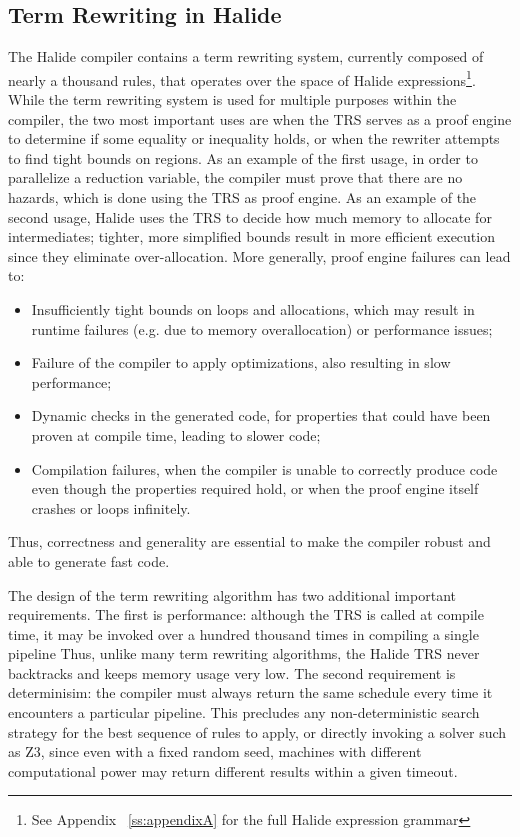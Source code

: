 \documentclass[sigplan,10pt,review,anonymous]{acmart}\settopmatter{printfolios=true,printccs=false,printacmref=false}
\begin{document}
\subsection{Term Rewriting in Halide}

The Halide compiler contains a term rewriting system, currently composed of
nearly a thousand rules, that operates over the space of Halide
expressions\footnote{See Appendix ~\ref{ss:appendixA} for the full Halide
  expression grammar}. While the term rewriting system is used for multiple
purposes within the compiler, the two most important
uses are when the TRS serves as a proof engine to determine if
some equality or inequality holds, or when the rewriter attempts to find tight
bounds on regions. As an example of the first usage, in order to parallelize a
reduction variable, the compiler must prove that there are no hazards, which is
done using the TRS as proof engine.  As an example of the second usage, Halide uses
the TRS to decide how much memory to allocate for intermediates; tighter, more
simplified bounds result in more efficient execution since they eliminate over-allocation.
More generally, proof engine failures can lead to:
\begin{itemize}
\item Insufficiently tight bounds on loops and allocations, which may result in
  runtime failures (e.g. due to memory overallocation) or performance issues;

\item Failure of the compiler to apply optimizations, also resulting in slow performance;

\item Dynamic checks in the generated code, for properties that could have been proven
  at compile time, leading to slower code;

\item Compilation failures, when the compiler is unable to correctly produce code
  even though the properties required hold, or when the proof engine itself crashes
  or loops infinitely.
\end{itemize}
Thus, correctness and generality are essential to make the compiler robust and
able to generate fast code.

The design of the term rewriting algorithm has two additional important
requirements. The first is performance: although the TRS is called at
compile time, it may be invoked over a hundred thousand times in compiling a single pipeline
Thus, unlike many term rewriting algorithms, the Halide TRS
never backtracks and keeps memory usage very low. The second requirement is determinisim: the compiler must
always return the same schedule every time it encounters a particular pipeline.
This precludes any non-deterministic search strategy for the best sequence of
rules to apply, or directly invoking a solver such as Z3, since even with a
fixed random seed, machines with different computational power may return
different results within a given timeout.
\end{document}
